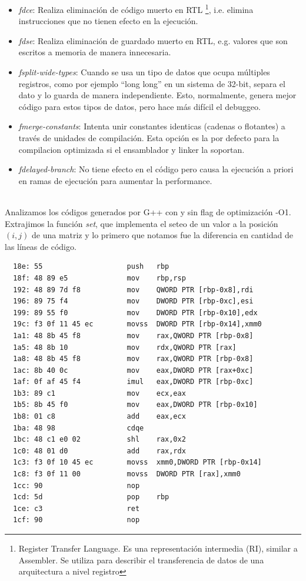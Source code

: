 \begin{itemize}
	\item \textit{fdce}: Realiza eliminación de código muerto en RTL \footnote{Register Transfer Language. Es una representación intermedia (RI), similar a Assembler. Se utiliza para describir el transferencia de datos de una arquitectura a nivel registro}, i.e. elimina instrucciones que no tienen efecto en la ejecución.
	\item \textit{fdse}: Realiza eliminación de guardado muerto en RTL, e.g. valores que son escritos a memoria de manera innecesaria.
	\item \textit{fsplit-wide-types}: Cuando se usa un tipo de datos que ocupa múltiples registros, como por ejemplo ``long long'' en un sistema de 32-bit, separa el dato y lo guarda de manera independiente. Esto, normalmente, genera mejor código para estos tipos de datos, pero hace más difícil el debuggeo.
	\item \textit{fmerge-constants}: Intenta unir constantes identicas (cadenas o flotantes) a través de unidades de compilación. Esta opción es la por defecto para la compilacion optimizada si el ensamblador y linker la soportan.
	\item \textit{fdelayed-branch}: No tiene efecto en el código pero causa la ejecución a priori en ramas de ejecución para aumentar la performance.
\end{itemize}

~\\
Analizamos los códigos generados por G++ con y sin flag de optimización -O1. Extrajimos la función \textit{set}, que implementa el seteo de un valor a la posición $(i, j)$ de una matriz y lo primero que notamos fue la diferencia en cantidad de las líneas de código.

{} 
\begin{lstlisting}
  18e: 55                    push   rbp
  18f: 48 89 e5              mov    rbp,rsp
  192: 48 89 7d f8           mov    QWORD PTR [rbp-0x8],rdi
  196: 89 75 f4              mov    DWORD PTR [rbp-0xc],esi
  199: 89 55 f0              mov    DWORD PTR [rbp-0x10],edx
  19c: f3 0f 11 45 ec        movss  DWORD PTR [rbp-0x14],xmm0
  1a1: 48 8b 45 f8           mov    rax,QWORD PTR [rbp-0x8]
  1a5: 48 8b 10              mov    rdx,QWORD PTR [rax]
  1a8: 48 8b 45 f8           mov    rax,QWORD PTR [rbp-0x8]
  1ac: 8b 40 0c              mov    eax,DWORD PTR [rax+0xc] 
  1af: 0f af 45 f4           imul   eax,DWORD PTR [rbp-0xc]
  1b3: 89 c1                 mov    ecx,eax
  1b5: 8b 45 f0              mov    eax,DWORD PTR [rbp-0x10]
  1b8: 01 c8                 add    eax,ecx
  1ba: 48 98                 cdqe   
  1bc: 48 c1 e0 02           shl    rax,0x2
  1c0: 48 01 d0              add    rax,rdx
  1c3: f3 0f 10 45 ec        movss  xmm0,DWORD PTR [rbp-0x14]
  1c8: f3 0f 11 00           movss  DWORD PTR [rax],xmm0
  1cc: 90                    nop
  1cd: 5d                    pop    rbp
  1ce: c3                    ret    
  1cf: 90                    nop
\end{lstlisting}

